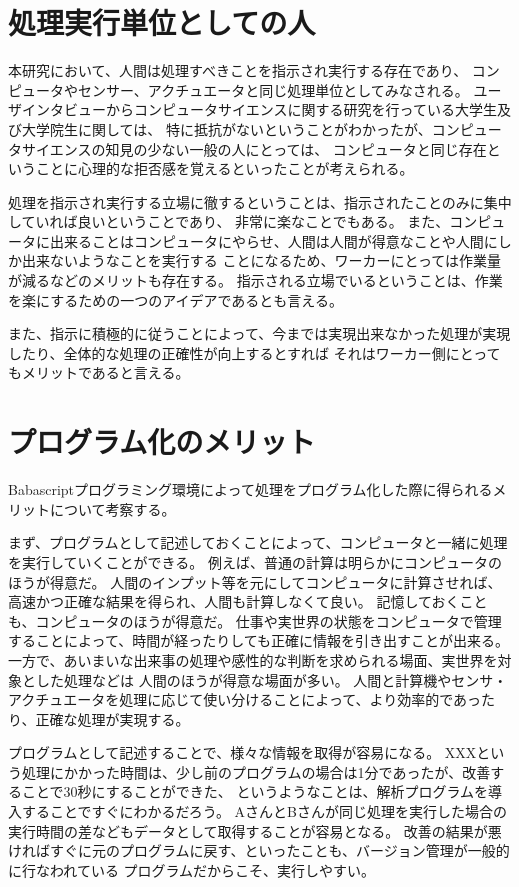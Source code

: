 \section{処理実行単位としての人}\label{ux51e6ux7406ux5b9fux884cux5358ux4f4dux3068ux3057ux3066ux306eux4eba}

本研究において、人間は処理すべきことを指示され実行する存在であり、
コンピュータやセンサー、アクチュエータと同じ処理単位としてみなされる。
ユーザインタビューからコンピュータサイエンスに関する研究を行っている大学生及び大学院生に関しては、
特に抵抗がないということがわかったが、コンピュータサイエンスの知見の少ない一般の人にとっては、
コンピュータと同じ存在ということに心理的な拒否感を覚えるといったことが考えられる。

処理を指示され実行する立場に徹するということは、指示されたことのみに集中していれば良いということであり、
非常に楽なことでもある。
また、コンピュータに出来ることはコンピュータにやらせ、人間は人間が得意なことや人間にしか出来ないようなことを実行する
ことになるため、ワーカーにとっては作業量が減るなどのメリットも存在する。
指示される立場でいるということは、作業を楽にするための一つのアイデアであるとも言える。

また、指示に積極的に従うことによって、今までは実現出来なかった処理が実現したり、全体的な処理の正確性が向上するとすれば
それはワーカー側にとってもメリットであると言える。

\section{プログラム化のメリット}\label{ux30d7ux30edux30b0ux30e9ux30e0ux5316ux306eux30e1ux30eaux30c3ux30c8}

Babascriptプログラミング環境によって処理をプログラム化した際に得られるメリットについて考察する。

まず、プログラムとして記述しておくことによって、コンピュータと一緒に処理を実行していくことができる。
例えば、普通の計算は明らかにコンピュータのほうが得意だ。
人間のインプット等を元にしてコンピュータに計算させれば、高速かつ正確な結果を得られ、人間も計算しなくて良い。
記憶しておくことも、コンピュータのほうが得意だ。
仕事や実世界の状態をコンピュータで管理することによって、時間が経ったりしても正確に情報を引き出すことが出来る。
一方で、あいまいな出来事の処理や感性的な判断を求められる場面、実世界を対象とした処理などは
人間のほうが得意な場面が多い。
人間と計算機やセンサ・アクチュエータを処理に応じて使い分けることによって、より効率的であったり、正確な処理が実現する。

プログラムとして記述することで、様々な情報を取得が容易になる。
XXXという処理にかかった時間は、少し前のプログラムの場合は1分であったが、改善することで30秒にすることができた、
というようなことは、解析プログラムを導入することですぐにわかるだろう。
AさんとBさんが同じ処理を実行した場合の実行時間の差などもデータとして取得することが容易となる。
改善の結果が悪ければすぐに元のプログラムに戻す、といったことも、バージョン管理が一般的に行なわれている
プログラムだからこそ、実行しやすい。

